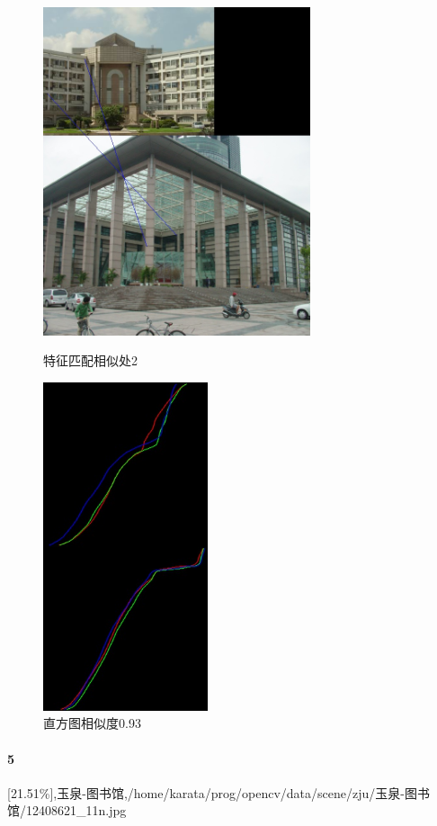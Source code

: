 \begin{figure}[htb]
\begin{minipage}[t]{0.5\linewidth}
\centering
\includegraphics[height=3.8in]{玉泉曹楼.jpg.d/im4sift.jpg}
\caption{特征匹配相似处2}
\label{fig:side:a}
\end{minipage}%
\begin{minipage}[t]{0.5\linewidth}
\centering
\includegraphics[height=3.8in]{玉泉曹楼.jpg.d/im4hist2.jpg}
\caption{直方图相似度0.93}
\label{fig:side:a}
\end{minipage}%
\end{figure}

\paragraph{5}
[21.51\%],玉泉-图书馆,/home/karata/prog/opencv/data/scene/zju/玉泉-图书馆/12408621\_11n.jpg

